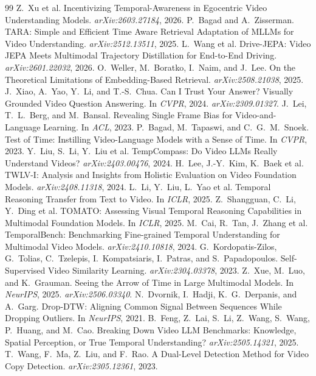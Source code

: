 \documentclass{article}
\theoremstyle{remark}
\begin{document}
\begin{thebibliography}{99}
 Z.~Xu et al. Incentivizing Temporal-Awareness in Egocentric Video Understanding Models. \emph{arXiv:2603.27184}, 2026.
 P.~Bagad and A.~Zisserman. TARA: Simple and Efficient Time Aware Retrieval Adaptation of MLLMs for Video Understanding. \emph{arXiv:2512.13511}, 2025.
 L.~Wang et al. Drive-JEPA: Video JEPA Meets Multimodal Trajectory Distillation for End-to-End Driving. \emph{arXiv:2601.22032}, 2026.
 O.~Weller, M.~Boratko, I.~Naim, and J.~Lee. On the Theoretical Limitations of Embedding-Based Retrieval. \emph{arXiv:2508.21038}, 2025.
 J.~Xiao, A.~Yao, Y.~Li, and T.-S.~Chua. Can I Trust Your Answer? Visually Grounded Video Question Answering. In \emph{CVPR}, 2024. \emph{arXiv:2309.01327}.
 J.~Lei, T.~L.~Berg, and M.~Bansal. Revealing Single Frame Bias for Video-and-Language Learning. In \emph{ACL}, 2023.
 P.~Bagad, M.~Tapaswi, and C.~G.~M.~Snoek. Test of Time: Instilling Video-Language Models with a Sense of Time. In \emph{CVPR}, 2023.
 Y.~Liu, S.~Li, Y.~Liu et al. TempCompass: Do Video LLMs Really Understand Videos? \emph{arXiv:2403.00476}, 2024.
 H.~Lee, J.-Y.~Kim, K.~Baek et al. TWLV-I: Analysis and Insights from Holistic Evaluation on Video Foundation Models. \emph{arXiv:2408.11318}, 2024.
 L.~Li, Y.~Liu, L.~Yao et al. Temporal Reasoning Transfer from Text to Video. In \emph{ICLR}, 2025.
 Z.~Shangguan, C.~Li, Y.~Ding et al. TOMATO: Assessing Visual Temporal Reasoning Capabilities in Multimodal Foundation Models. In \emph{ICLR}, 2025.
 M.~Cai, R.~Tan, J.~Zhang et al. TemporalBench: Benchmarking Fine-grained Temporal Understanding for Multimodal Video Models. \emph{arXiv:2410.10818}, 2024.
 G.~Kordopatis-Zilos, G.~Tolias, C.~Tzelepis, I.~Kompatsiaris, I.~Patras, and S.~Papadopoulos. Self-Supervised Video Similarity Learning. \emph{arXiv:2304.03378}, 2023.
 Z.~Xue, M.~Luo, and K.~Grauman. Seeing the Arrow of Time in Large Multimodal Models. In \emph{NeurIPS}, 2025. \emph{arXiv:2506.03340}.
 N.~Dvornik, I.~Hadji, K.~G.~Derpanis, and A.~Garg. Drop-DTW: Aligning Common Signal Between Sequences While Dropping Outliers. In \emph{NeurIPS}, 2021.
 B.~Feng, Z.~Lai, S.~Li, Z.~Wang, S.~Wang, P.~Huang, and M.~Cao. Breaking Down Video LLM Benchmarks: Knowledge, Spatial Perception, or True Temporal Understanding? \emph{arXiv:2505.14321}, 2025.
 T.~Wang, F.~Ma, Z.~Liu, and F.~Rao. A Dual-Level Detection Method for Video Copy Detection. \emph{arXiv:2305.12361}, 2023.

\end{thebibliography}
\end{document}
